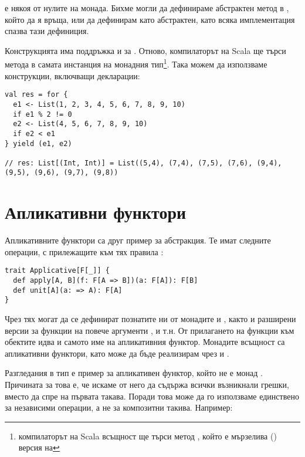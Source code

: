  е някоя от нулите на монада. Бихме могли да дефинираме абстрактен метод  в , който да я връща, или да дефинирам  като абстрактен, като всяка имплементация спазва тази дефиниция.

Конструкцията  има поддръжка и за . Отново, компилаторът на Scala ще търси метода в самата инстанция на монадния тип\footnote{компилаторът на Scala всъщност ще търси метод , който е мързелива () версия на }. Така можем да използваме  конструкции, включващи  декларации:

\begin{lstlisting}
val res = for {
  e1 <- List(1, 2, 3, 4, 5, 6, 7, 8, 9, 10)
  if e1 % 2 != 0
  e2 <- List(4, 5, 6, 7, 8, 9, 10)
  if e2 < e1
} yield (e1, e2)

// res: List[(Int, Int)] = List((5,4), (7,4), (7,5), (7,6), (9,4), (9,5), (9,6), (9,7), (9,8))
\end{lstlisting}

\section{Апликативни функтори}
\label{sec:applicatives}

Апликативните функтори са друг пример за абстракция. Те имат следните операции, с прилежащите към тях правила \cite{chiusano2014FPinScala}:

\begin{lstlisting}
trait Applicative[F[_]] {
  def apply[A, B](f: F[A => B])(a: F[A]): F[B]
  def unit[A](a: => A): F[A]
}
\end{lstlisting}

Чрез тях могат да се дефинират познатите ни от монадите  и , както и разширени версии за функции на повече аргументи ,  и т.н. От прилагането на функции към обектите идва и самото име на апликативния функтор. Монадите всъщност са апликативни функтори, като  може да бъде реализирам чрез  и .

Разгледания в  тип  е пример за апликативен функтор, който не е монад \cite{chiusano2014FPinScala}. Причината за това е, че искаме от него да съдържа всички възникнали грешки, вместо да спре на първата такава. Поради това може да го използваме единствено за независими операции, а не за композитни такива. Например:


